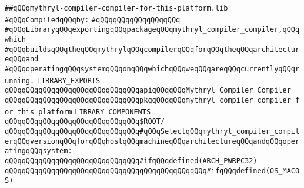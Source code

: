 \label{src/lib/core/mythryl-compiler-compiler/mythryl-compiler-compiler-for-this-platform.lib}
\verb|##qQQqmythryl-compiler-compiler-for-this-platform.lib|\newline
\newline
\verb|#qQQqCompiledqQQqby:|\newline
\verb|#qQQqqQQqqQQqqQQqqQQq|\newline
\newline
\verb|#qQQqLibraryqQQqexportingqQQqpackageqQQqmythryl_compiler_compiler,qQQqwhich|\newline
\verb|#qQQqbuildsqQQqtheqQQqmythrylqQQqcompilerqQQqforqQQqtheqQQqarchitectureqQQqand|\newline
\verb|#qQQqoperatingqQQqsystemqQQqonqQQqwhichqQQqweqQQqareqQQqcurrentlyqQQqrunning.|\newline
\newline
\newline
\newline
\newline
\verb|LIBRARY_EXPORTS|\newline
\newline
\verb|qQQqqQQqqQQqqQQqqQQqqQQqqQQqqQQqapiqQQqqQQqMythryl_Compiler_Compiler|\newline
\verb|qQQqqQQqqQQqqQQqqQQqqQQqqQQqqQQqpkgqQQqqQQqmythryl_compiler_compiler_for_this_platform|\newline
\newline
\newline
\newline
\verb|LIBRARY_COMPONENTS|\newline
\newline
\verb|qQQqqQQqqQQqqQQqqQQqqQQqqQQqqQQq$ROOT/|\newline
\newline
\verb|qQQqqQQqqQQqqQQqqQQqqQQqqQQqqQQq#qQQqSelectqQQqmythryl_compiler_compilerqQQqversionqQQqforqQQqhostqQQqmachineqQQqarchitectureqQQqandqQQqoperatingqQQqsystem:|\newline
\newline
\verb|qQQqqQQqqQQqqQQqqQQqqQQqqQQqqQQq#ifqQQqdefined(ARCH_PWRPC32)|\newline
\newline
\verb|qQQqqQQqqQQqqQQqqQQqqQQqqQQqqQQqqQQqqQQqqQQqqQQq#ifqQQqdefined(OS_MACOS)|\newline
